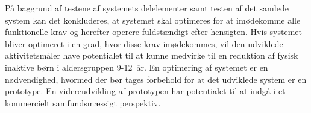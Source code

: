 På baggrund af testene af systemets delelementer samt testen af det samlede system kan det konkluderes, at systemet skal optimeres for at imødekomme alle funktionelle krav og herefter operere fuldstændigt efter hensigten. Hvis systemet bliver optimeret i en grad, hvor disse krav imødekommes, vil den udviklede aktivitetsmåler have potentialet til at kunne medvirke til en reduktion af fysisk inaktive børn i aldersgruppen 9-12~år. En optimering af systemet er en nødvendighed, hvormed der bør tages forbehold for at det udviklede system er en prototype. En videreudvikling af prototypen har potentialet til at indgå i et kommercielt samfundsmæssigt perspektiv.